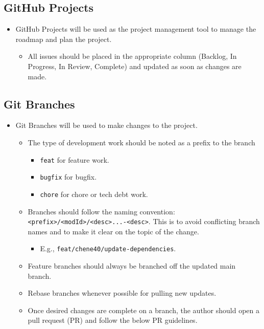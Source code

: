 \documentclass{article}
\begin{document}
\subsection{GitHub Projects}
\begin{itemize}
    \item GitHub Projects will be used as the project management tool to manage the roadmap and plan the project.
    \begin{itemize}
        \item All issues should be placed in the appropriate column (Backlog, In Progress, In Review, Complete) and updated as soon as changes are made.
    \end{itemize}
\end{itemize}

\subsection{Git Branches}
\begin{itemize}
    \item Git Branches will be used to make changes to the project.
    \begin{itemize}
        \item The type of development work should be noted as a prefix to the branch
        \begin{itemize}
            \item \texttt{feat} for feature work.
            \item \texttt{bugfix} for bugfix.
            \item \texttt{chore} for chore or tech debt work.
        \end{itemize}
        \item Branches should follow the naming convention: \texttt{<prefix>/<modId>/<desc>...-<desc>}. This is to avoid conflicting branch names and to make it clear on the topic of the change.
        \begin{itemize}
            \item E.g., \texttt{feat/chene40/update-dependencies}.
        \end{itemize}
        \item Feature branches should always be branched off the updated main branch.
        \item Rebase branches whenever possible for pulling new updates.
        \item Once desired changes are complete on a branch, the author should open a pull request (PR) and follow the below PR guidelines.
    \end{itemize}
\end{itemize}
\end{document}
